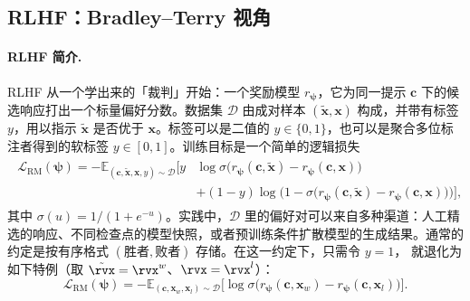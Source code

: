 \subsection{RLHF：Bradley--Terry 视角}\label{subsec:rlhf-bradley-terry}


\paragraph{RLHF 简介.}
RLHF 从一个学出来的「裁判」开始：一个奖励模型 $r_{\bm\psi}$，它为同一提示 $\mathbf c$ 下的候选响应打出一个标量偏好分数。数据集 $\mathcal D$ 由成对样本 $(\tilde{\mathbf x},\mathbf x)$ 构成，并带有标签 $y$，用以指示 $\tilde{\mathbf x}$ 是否优于 $\mathbf x$。标签可以是二值的 $y\in\{0,1\}$，也可以是聚合多位标注者得到的软标签 $y\in[0,1]$。训练目标是一个简单的逻辑损失
\begin{align}\label{eq:rm-emp}
\begin{aligned}
    \mathcal L_{\mathrm{RM}}(\bm\psi)
=
- \mathbb E_{(\mathbf c,\tilde{\mathbf x},\mathbf x,y)\sim\mathcal D}
\Big[
y &\log \sigma \big(r_{\bm\psi}(\mathbf c,\tilde{\mathbf x})-r_{\bm\psi}(\mathbf c,\mathbf x)\big)
\\ &+(1-y)\log \big(1-\sigma \big(r_{\bm\psi}(\mathbf c,\tilde{\mathbf x})-r_{\bm\psi}(\mathbf c,\mathbf x)\big)\big)
\Big],
\end{aligned}
\end{align}
其中 $\sigma(u)=1/(1+e^{-u})$。实践中，$\mathcal D$ 里的偏好对可以来自多种渠道：人工精选的响应、不同检查点的模型快照，或者预训练条件扩散模型的生成结果。通常的约定是按有序格式 $(\text{胜者}, \text{败者})$ 存储。在这一约定下，只需令 $y=1$， 就退化为如下特例（取 $\tilde\rvx = \rvx^w$、$\rvx = \rvx^l$）：
\begin{equation}\label{eq:rm-bt}
\mathcal L_{\mathrm{RM}}(\bm\psi)
=
- \mathbb E_{(\mathbf c,\mathbf x_w,\mathbf x_l)\sim\mathcal D}
\Big[\log \sigma \big(r_{\bm\psi}(\mathbf c,\mathbf x_w)-r_{\bm\psi}(\mathbf c,\mathbf x_l)\big)\Big].
\end{equation}


